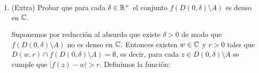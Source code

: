 \documentclass[12pt]{article}
\begin{document}
\begin{ejercicio}[2.5 puntos]
\begin{enumerate}
            Por tanto, tenemos que $0$ es un punto regular de $f$, ya que:
            \begin{equation*}
                \lim_{z\to 0} zf(z) = 0
            \end{equation*}

            Fijado ahora $k\in \bb{N}$, consideramos el punto $a_k\in A$. Consideramos la serie $\sum\limits_{\substack{n\geq 1\\n\neq k}} \frac{f_n(z)}{n^n}$, que converge uniformemente en cada compacto de $\Omega\cup\{a_k\}$. Por tanto, podemos aplicar el Teorema de lA Convergencia de Weierstrass para deducir que dicha serie es holomorfa en $\Omega\cup\{a_k\}$. Por tanto, tenemos que:
            \begin{align*}
                \lim_{z\to a_k} f(z) &= \lim_{z\to a_k} (z-a_k) \dfrac{f_k(z)}{k^k} + (z-a_k) \sum_{\substack{n\geq 1\\n\neq k}} \frac{f_n(z)}{n^n} = \lim_{z\to a_k} \dfrac{1}{k^k} + (z-a_k) \sum_{\substack{n\geq 1\\n\neq k}} \frac{f_n(z)}{n^n} =\\&= \dfrac{1}{k^k} + 0 = \dfrac{1}{k^k}\neq 0.
            \end{align*}

            Por tanto, $a_k$ es un polo de orden $1$ de $f$.

            \item (Extra) Probar que para cada $\delta\in \mathbb{R}^+$ el conjunto $f\left(D(0,\delta)\setminus A\right)$ es denso en $\mathbb{C}$.
            
            Suponemos por reducción al absurdo que existe $\delta > 0$ de modo que $f\left(D(0, \delta) \setminus A\right)$ no es denso en $\mathbb{C}$. Entonces existen $w \in \mathbb{C}$ y $r > 0$ tales que $D(w, r)\cap f\left(D(0, \delta)\setminus A\right) = \emptyset$, es decir, para cada $z \in D(0, \delta) \setminus A$ se cumple que $|f(z) - w| > r$. Definimos la función:


\end{enumerate}
\end{ejercicio}
\end{document}
